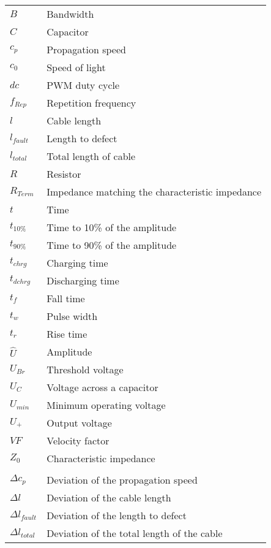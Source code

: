 \begin{longtable}[l]{@{}ll@{}}%
    \( B \) & Bandwidth\\
    \( C \) & Capacitor\\
    \( c_p \) & Propagation speed\\
    \( c_0 \) & Speed of light\\
    \( dc \) & PWM duty cycle \\
    \( f_{Rep} \) & Repetition frequency\\
    \( l \) & Cable length\\
    \( l_{fault} \) & Length to defect\\
    \( l_{total} \) & Total length of cable\\
    \( R \) & Resistor\\
    \( R_{Term} \) & Impedance matching the characteristic impedance\\
    \( t \) & Time\\
    \( t_{10\%} \) & Time to 10\% of the amplitude\\
    \( t_{90\%} \) & Time to 90\% of the amplitude\\
    \( t_{chrg} \) & Charging time\\
    \( t_{dchrg} \) & Discharging time\\
    \( t_f \) & Fall time\\
    \( t_w \) & Pulse width\\
    \( t_{r} \) & Rise time\\
    \( \hat{U} \) & Amplitude\\
    \( U_{Br} \) & Threshold voltage\\
    \( U_C \) & Voltage across a capacitor \\
    \( U_{min} \) & Minimum operating voltage\\
    \( U_{+} \) & Output voltage\\
    \( VF \) & Velocity factor\\
    \( Z_0 \) & Characteristic impedance\\
    & \\
    \( \Delta c_p \) & Deviation of the propagation speed\\
    \( \Delta l \) & Deviation of the cable length\\
    \( \Delta l_{fault} \) & Deviation of the length to defect\\
    \( \Delta l_{total} \) & Deviation of the total length of the cable\\

\end{longtable}
